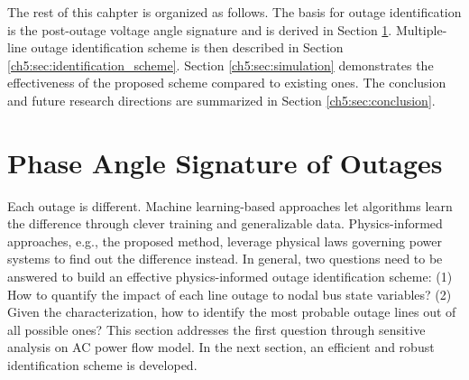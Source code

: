 The rest of this cahpter is organized as follows. The basis for outage identification is the post-outage voltage angle signature and is derived in Section \ref{ch5:sec:angle_signature}. Multiple-line outage identification scheme is then described in Section \ref{ch5:sec:identification_scheme}. Section \ref{ch5:sec:simulation} demonstrates the effectiveness of the proposed scheme compared to existing ones. The conclusion and future research directions are summarized in Section \ref{ch5:sec:conclusion}. 


\section{Phase Angle Signature of Outages}
\label{ch5:sec:angle_signature}

Each outage is different. Machine learning-based approaches let algorithms learn the difference through clever training and generalizable data. Physics-informed approaches, e.g., the proposed method, leverage physical laws governing power systems to find out the difference instead. In general, two questions need to be answered to build an effective physics-informed outage identification scheme: (1) How to quantify the impact of each line outage to nodal bus state variables? (2) Given the characterization, how to identify the most probable outage lines out of all possible ones? This section addresses the first question through sensitive analysis on AC power flow model. In the next section, an efficient and robust identification scheme is developed. 

